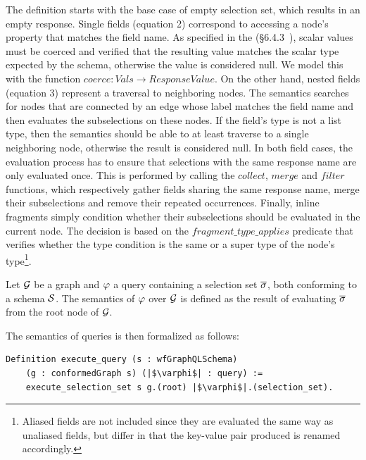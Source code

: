 The definition starts with the base case of empty selection set, which results in an empty response. 
Single fields (equation 2) correspond to accessing a node's property that matches the field name. 
As specified in the \spec (\cf\S6.4.3~\cite{gqlspec}), scalar values must be coerced and verified that the resulting value matches the scalar type expected by the schema, otherwise the value is considered null.
We model this with the function  $\mathit{coerce} : \mathit{Vals} \to \mathit{ResponseValue}$.
On the other hand, nested fields (equation 3) represent a traversal to neighboring nodes. The semantics searches for nodes that are connected by an edge whose label matches the field name
and then evaluates the subselections on these nodes. If the field's type is not a list type, then the semantics should be able to at least traverse to a single neighboring node, otherwise the result is considered null. 
In both field cases, the evaluation process has to ensure that selections with the same response name are only evaluated once. 
This is performed by calling the $\mathit{collect}$, $\mathit{merge}$ and $\mathit{filter}$ functions, which respectively gather fields sharing the same response name, merge their subselections 
and remove their repeated occurrences. 
Finally, inline fragments simply condition whether their subselections should be evaluated in the current node. 
The decision is based on the $\mathit{fragment\_type\_applies}$ predicate that verifies whether the type condition is the same or a super type of the node's type\footnote{Aliased fields are not included since they are evaluated the same way as unaliased fields, but differ in that the key-value pair produced is renamed accordingly.}.


\begin{definition}
Let $\mathcal{G}$ be a graph and $\varphi$ a query containing a selection set $\overline{\sigma}$, both conforming to a schema $\mathcal{S}$. The semantics of $\varphi$ over $\mathcal{G}$ is defined as the result of evaluating $\overline{\sigma}$ from the root node of $\mathcal{G}$.
\end{definition}

The semantics of queries is then formalized as follows:
\begin{verbatim}
Definition execute_query (s : wfGraphQLSchema)
    (g : conformedGraph s) (|$\varphi$| : query) :=
    execute_selection_set s g.(root) |$\varphi$|.(selection_set).
\end{verbatim}

